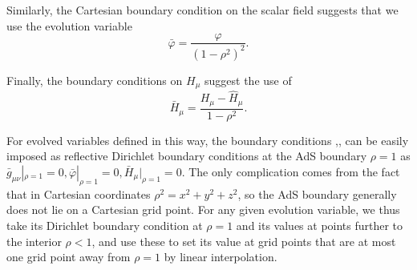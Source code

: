 \documentclass[12pt]{iopart} %
\begin{document}
Similarly, the Cartesian boundary condition on the scalar field  suggests that we use the evolution variable
\begin{equation}
\bar{\varphi}=\frac{\varphi }{(1-\rho^2)^2}.
\end{equation}

Finally, the boundary conditions  on $H_\mu$ suggest the use of
\begin{equation}\label{eq:soufunb}
\bar{H}_\mu=\frac{H_\mu-\hat{H}_\mu}{1-\rho^2 }.
\end{equation}


For evolved variables defined in this way, the boundary conditions ,,  can be easily imposed as reflective Dirichlet boundary conditions at the AdS boundary $\rho=1$ as $\bar{g}_{\mu\nu}|_{\rho=1}=0,\bar{\varphi}|_{\rho=1}=0,\bar{H}_\mu|_{\rho=1}=0$.
The only complication comes from the fact that in Cartesian coordinates $\rho^2=x^2+y^2+z^2$, so the AdS boundary generally does not lie on a Cartesian grid point. 
For any given evolution variable, we thus take its Dirichlet boundary condition at $\rho=1$ and its values at points further to the interior $\rho<1$, and use these to set its value at grid points that are at most one grid point away from $\rho=1$ by linear interpolation. 
\end{document}
